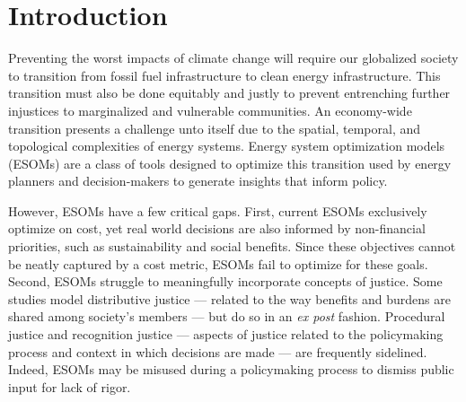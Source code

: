 \section{Introduction}





Preventing the worst impacts of climate change will require our globalized society to transition from
fossil fuel infrastructure to clean energy infrastructure. This transition must
also be done equitably and justly to prevent entrenching further injustices to
marginalized and vulnerable communities. An economy-wide transition presents a
challenge unto itself due to the spatial, temporal, and topological complexities
of energy systems. Energy system optimization models (ESOMs) are a class of
tools designed to optimize this transition used by energy planners and
decision-makers to generate insights that inform policy. 

However, ESOMs have a few critical gaps. First, current ESOMs exclusively 
optimize on cost, yet real world decisions are also informed by non-financial 
priorities, such as sustainability and social benefits. Since these objectives 
cannot be neatly captured by a cost metric, ESOMs fail to optimize for these 
goals. Second, ESOMs struggle to meaningfully incorporate concepts of justice. 
Some studies model distributive justice --- related to the way benefits and 
burdens are shared among society's members --- but do so in an \textit{ex post} 
fashion. Procedural justice and recognition justice --- aspects of justice 
related to the policymaking process and context in which decisions are made --- 
are frequently sidelined. Indeed, ESOMs may be misused during a policymaking 
process to dismiss public input for lack of rigor. 

